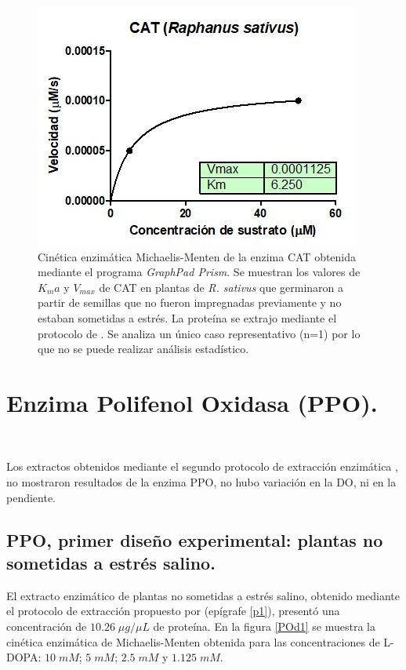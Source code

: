 \begin{figure}[hbtp]
	\centering
	\includegraphics[scale=0.95]{Imagenes/CAT}
	\caption{Cin\'etica enzim\'atica Michaelis-Menten de la enzima CAT obtenida mediante el programa \textit{GraphPad Prism}. Se muestran los valores de $K_ma$ y $V_{max}$ de CAT en plantas de \textit{R. sativus} que germinaron a partir de semillas que no fueron impregnadas previamente y no estaban sometidas a estr\'es. La prote\'ina se extrajo mediante el protocolo de \cite{liu2010exogenous}. Se analiza un único caso representativo (n=1) por lo que no se puede realizar análisis estadístico.}
	\label{cat}
\end{figure}

\section{Enzima Polifenol Oxidasa (PPO).}\

Los extractos obtenidos mediante el segundo protocolo de extracci\'on enzim\'atica \citep{baquero2005catalase}, no mostraron resultados de la enzima PPO, no hubo variaci\'on en la DO, ni en la pendiente. 

\pagebreak

\subsection {PPO, primer dise\~no experimental: plantas no sometidas a estr\'es salino.}

El extracto enzim\'atico de plantas no sometidas a estr\'es salino, obtenido mediante el protocolo de extracci\'on propuesto por \cite{liu2010exogenous} (ep\'igrafe \ref{p1}), present\'o una concentraci\'on de $10.26 \;\mu g/ \mu L$ de prote\'ina. En la figura \ref{POd1} se muestra la cin\'etica enzim\'atica de Michaelis-Menten obtenida para las concentraciones de L-DOPA: $10\;mM$; $5\;mM$; $2.5\;mM$ y $1.125\;mM$.\\

